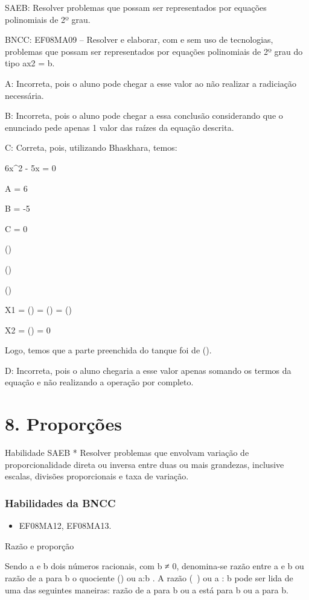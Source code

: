 {SAEB: Resolver problemas que possam ser representados por equações
polinomiais de 2º grau.

BNCC: EF08MA09 -- Resolver e elaborar, com e sem uso de tecnologias,
problemas que possam ser representados por equações polinomiais de 2º
grau do tipo ax2 = b.

A: Incorreta, pois o aluno pode chegar a esse valor ao não realizar a
radiciação necessária.

B: Incorreta, pois o aluno pode chegar a essa conclusão considerando que
o enunciado pede apenas 1 valor das raízes da equação descrita.

C: Correta, pois, utilizando Bhaskhara, temos:

6x^2 - 5x = 0

A = 6

B = -5

C = 0

()

()

()

X1 = () = () = ()

X2 = () = 0

Logo, temos que a parte preenchida do tanque foi de ().

D: Incorreta, pois o aluno chegaria a esse valor apenas somando os
termos da equação e não realizando a operação por completo.


\chapter{8. Proporções}

Habilidade SAEB * Resolver problemas que envolvam variação de
proporcionalidade direta ou inversa entre duas ou mais grandezas,
inclusive escalas, divisões proporcionais e taxa de variação.

\subsection{Habilidades da BNCC}

\begin{itemize}
\item EF08MA12, EF08MA13.
\end{itemize}

Razão e proporção

Sendo a e b dois números racionais, com b ≠ 0, denomina-se razão entre a
e b ou razão de a para b o quociente () ou a:b . A razão
(\ ) ou a : b pode ser lida de uma das seguintes maneiras:
razão de a para b ou a está para b ou a para b.

}
